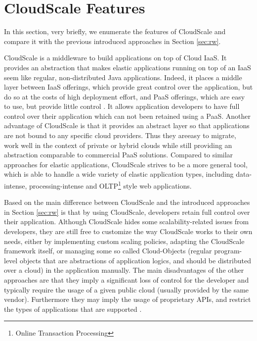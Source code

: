 \documentclass{sig-alternate}
\begin{document}
\section{CloudScale Features} {\label{cloudScale}
In this section, very briefly, we enumerate the features of CloudScale and compare it with the previous introduced approaches in Section \ref{sec:rw}.

CloudScale is a middleware to build applications on top of Cloud IaaS. It provides an abstraction that makes elastic applications running on top of an IaaS seem like regular, non-distributed Java applications. Indeed, it places a middle layer between IaaS offerings, which provide great control over the application, but do so at the costs of high deployment effort, and PaaS offerings, which are easy to use, but provide little control \cite{leitner2012cloudscale}. It allows application developers to have full control over their application which can not been retained using a PaaS. Another advantage of CloudScale is that it provides an abstract layer so that applications are not bound to any specific cloud providers. Thus they areeasy to migrate, work well in the context of private or hybrid clouds while still providing an abstraction comparable to commercial PaaS solutions. Compared to similar approaches for elastic applications, CloudScale strives to be a more general tool, which is able to handle a wide variety of elastic application types, including data-intense, processing-intense and OLTP\footnote{Online Transaction Processing} style web applications\cite{Leitner2013}.

Based on \cite{leitner2012cloudscale} the main difference between CloudScale and the introduced approaches in Section \ref{sec:rw} is that by using CloudScale, developers retain full control over their application. Although CloudScale hides some scalability-related issues from developers, they are still free to customize the way CloudScale works to their own needs, either by implementing custom scaling policies, adapting the CloudScale framework itself, or managing some so called Cloud-Objects (regular program-level objects that are abstractions of application logics, and should be distributed over a cloud) in the application manually. The main disadvantages of the other approaches are that they imply a significant loss of control for the developer and typically require the usage of a given public cloud (usually provided by the same vendor). Furthermore they may imply the usage of proprietary APIs, and restrict the types of applications that are supported \cite{Leitner2013}.

}
\end{document}
